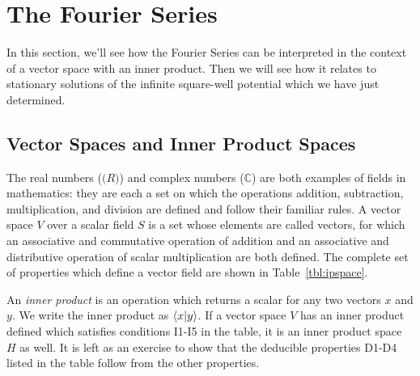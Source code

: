 \documentclass[12pt]{book}
\begin{document}
\section{The Fourier Series}

In this section, we'll see how the Fourier Series can be interpreted in the context of a vector space with an inner product.  Then we will see how it relates to stationary solutions of the infinite square-well potential which we have just determined.

\subsection{Vector Spaces and Inner Product Spaces}
The real numbers ($\mathbb(R)$) and complex numbers ($\mathbb{C}$) are both examples of fields in mathematics:  they are each a set on which the operations addition, subtraction, multiplication, and division are defined and follow their familiar rules.  A vector space $V$ over a scalar field $S$ is a set whose elements are called vectors, for which an associative and commutative operation of addition and an associative and distributive operation of scalar multiplication are both defined.    The complete set of properties which define a vector field are shown in Table~\ref{tbl:ipspace}.  

An {\em inner product} is an operation which returns a scalar for any two vectors $x$ and $y$.
We write the inner product as $\braket{x|y}$.  If a vector space $V$ has an inner product defined 
which satisfies conditions I1-I5 in the table, it is an inner product space $H$ as well.  It is left as an exercise to show that the deducible properties D1-D4 listed in the table follow from the other properties.
\end{document}

